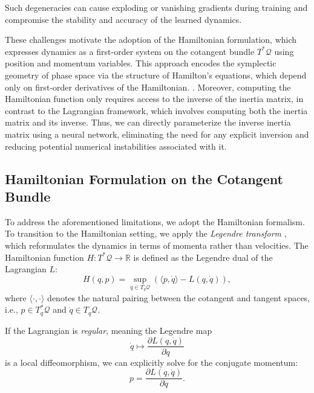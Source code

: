 \documentclass{article}
\theoremstyle{plain}
\theoremstyle{definition}
\theoremstyle{remark}
\begin{document}
Such degeneracies can cause exploding or vanishing gradients during training and compromise the stability and accuracy of the learned dynamics.

These challenges motivate the adoption of the Hamiltonian formulation, which expresses dynamics as a first-order system on the cotangent bundle $T^*\mathcal{Q}$ using position and momentum variables. This approach encodes the symplectic geometry of phase space via the structure of Hamilton’s equations, which depend only on first-order derivatives of the Hamiltonian. \cite{goldstein:mechanics}. Moreover, computing the Hamiltonian function only requires access to the inverse of the inertia matrix, in contrast to the Lagrangian framework, which involves computing both the inertia matrix and its inverse. Thus, we can directly parameterize the inverse inertia matrix using a neural network, eliminating the need for any explicit inversion and reducing potential numerical instabilities associated with it.

\subsection{Hamiltonian Formulation on the Cotangent Bundle}
To address the aforementioned limitations, we adopt the Hamiltonian formalism.  
To transition to the Hamiltonian setting, we apply the \emph{Legendre transform} \cite{arnold1989mathematical}, which reformulates the dynamics in terms of momenta rather than velocities.  
The Hamiltonian function $H: T^*\mathcal{Q} \rightarrow \mathbb{R}$ is defined as the Legendre dual of the Lagrangian $L$:
\begin{equation}
    H(q, p) = \sup_{\dot{q} \in T_q\mathcal{Q}} \left( \langle p, \dot{q} \rangle - L(q, \dot{q}) \right),
\end{equation}
where $\langle \cdot, \cdot \rangle$ denotes the natural pairing between the cotangent and tangent spaces, i.e., $p \in T_q^*\mathcal{Q}$ and $\dot{q} \in T_q\mathcal{Q}$.

If the Lagrangian is \emph{regular}, meaning the Legendre map
\begin{equation}
    \dot{q} \mapsto \frac{\partial L(q, \dot{q})}{\partial \dot{q}}
\end{equation}
is a local diffeomorphism, we can explicitly solve for the conjugate momentum:
\begin{equation}
    p = \frac{\partial L(q, \dot{q})}{\partial \dot{q}}.
\end{equation}
\end{document}
